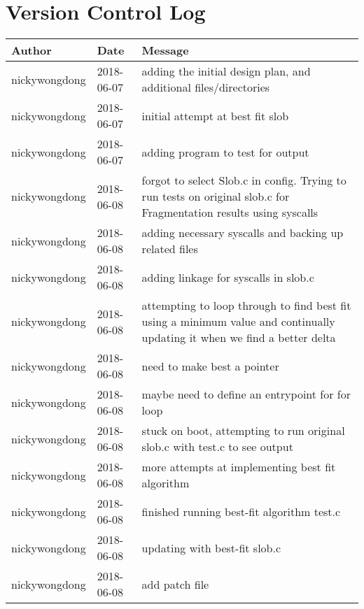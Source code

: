 \documentclass[onecolumn, draftclsnofoot,10pt, compsoc]{IEEEtran}
\begin{document}

\section{Version Control Log}


\begin{longtable} {|l|l|p{13cm}|}
    \hline
    \textbf{Author} & \textbf{Date} & \textbf{Message} \\ \hline
nickywongdong & 2018-06-07 & adding the initial design plan, and additional files/directories \\ \hline
nickywongdong & 2018-06-07 & initial attempt at best fit slob \\ \hline
nickywongdong & 2018-06-07 & adding program to test for output \\ \hline
nickywongdong & 2018-06-08 & forgot to select Slob.c in config. Trying to run tests on original slob.c for Fragmentation results using syscalls \\ \hline
nickywongdong & 2018-06-08 & adding necessary syscalls and backing up related files \\ \hline
nickywongdong & 2018-06-08 & adding linkage for syscalls in slob.c \\ \hline
nickywongdong & 2018-06-08 & attempting to loop through to find best fit using a minimum value and continually updating it when we find a better delta \\ \hline
nickywongdong & 2018-06-08 & need to make best a pointer \\ \hline
nickywongdong & 2018-06-08 & maybe need to define an entrypoint for for loop \\ \hline
nickywongdong & 2018-06-08 & stuck on boot, attempting to run original slob.c with test.c to see output \\ \hline
nickywongdong & 2018-06-08 & more attempts at implementing best fit algorithm \\ \hline
nickywongdong & 2018-06-08 & finished running best-fit algorithm test.c \\ \hline
nickywongdong & 2018-06-08 & updating with best-fit slob.c \\ \hline
nickywongdong & 2018-06-08 & add patch file \\ \hline

\end{longtable}
\end{document}
